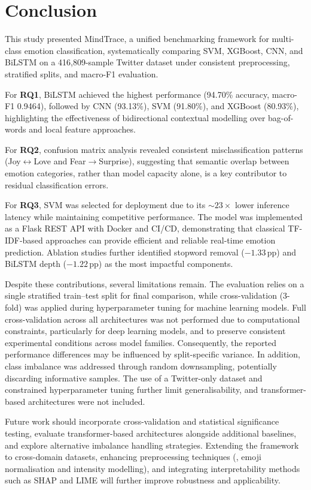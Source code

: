\section{Conclusion}
\label{sec:conclusion}

This study presented MindTrace, a unified benchmarking framework for multi-class emotion classification, systematically comparing SVM, XGBoost, CNN, and BiLSTM on a 416,809-sample Twitter dataset under consistent preprocessing, stratified splits, and macro-F1 evaluation.

For \textbf{RQ1}, BiLSTM achieved the highest performance (94.70\% accuracy, macro-F1 0.9464), followed by CNN (93.13\%), SVM (91.80\%), and XGBoost (80.93\%), highlighting the effectiveness of bidirectional contextual modelling over bag-of-words and local feature approaches.

For \textbf{RQ2}, confusion matrix analysis revealed consistent misclassification patterns (Joy$\leftrightarrow$Love and Fear$\rightarrow$Surprise), suggesting that semantic overlap between emotion categories, rather than model capacity alone, is a key contributor to residual classification errors.

For \textbf{RQ3}, SVM was selected for deployment due to its ${\sim}23\times$ lower inference latency while maintaining competitive performance. The model was implemented as a Flask REST API with Docker and CI/CD, demonstrating that classical TF-IDF-based approaches can provide efficient and reliable real-time emotion prediction. Ablation studies further identified stopword removal ($-1.33$\,pp) and BiLSTM depth ($-1.22$\,pp) as the most impactful components.

Despite these contributions, several limitations remain. The evaluation relies on a single stratified train--test split for final comparison, while cross-validation (3-fold) was applied during hyperparameter tuning for machine learning models. Full cross-validation across all architectures was not performed due to computational constraints, particularly for deep learning models, and to preserve consistent experimental conditions across model families. Consequently, the reported performance differences may be influenced by split-specific variance. In addition, class imbalance was addressed through random downsampling, potentially discarding informative samples. The use of a Twitter-only dataset and constrained hyperparameter tuning further limit generalisability, and transformer-based architectures were not included.

Future work should incorporate cross-validation and statistical significance testing, evaluate transformer-based architectures alongside additional baselines, and explore alternative imbalance handling strategies. Extending the framework to cross-domain datasets, enhancing preprocessing techniques (\eg, emoji normalisation and intensity modelling), and integrating interpretability methods such as SHAP and LIME will further improve robustness and applicability.
